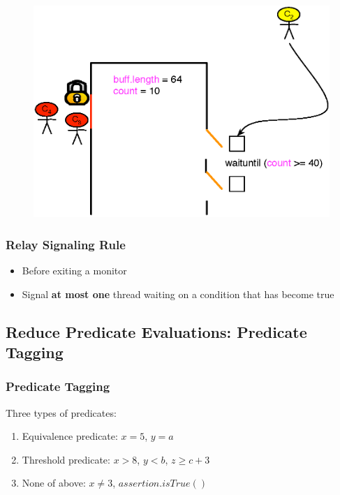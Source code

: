 \documentclass[mathserif,14pt,xcolor=table]{beamer}
\begin{document}
\begin{frame}
{\begin{figure}[ht!]
            \includegraphics[scale=0.75]{fig/sig_exp_5.eps}
        \end{figure}
    }
\end{frame}

\begin{frame}
    \frametitle{Relay Signaling Rule}
    \begin{itemize}
        \item Before exiting a monitor 
            \pause
        \item Signal {\bf at most one} thread waiting on a condition that 
            has become true
    \end{itemize}
\end{frame}

\subsection{Reduce Predicate Evaluations: Predicate Tagging}


\begin{frame}
    \frametitle{Predicate Tagging}

    Three types of predicates:
    \begin{enumerate}
    \item Equivalence predicate: $x=5$, $y=a$
    \item Threshold predicate: $x > 8$, $y < b$, $z \ge c + 3$
    \item None of above: $x \ne 3$, $assertion.isTrue()$
    \end{enumerate}
\end{frame}
\end{document}
